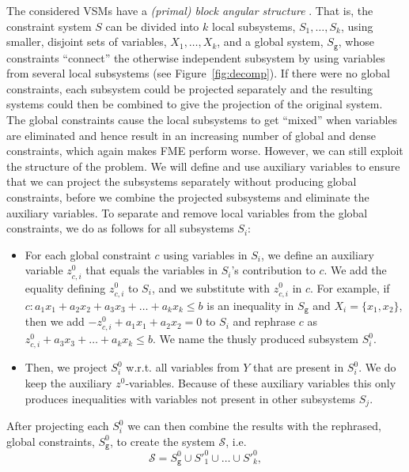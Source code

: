 \documentclass[citeauthoryear]{llncs}
\newcommand{\trt}[1]{\texttt{#1}}
\begin{document}
The considered VSMs have a \emph{(primal) block angular structure} \cite{williams}. That is, the constraint system $S$ can be divided into $k$ local subsystems, $S_1, \ldots, S_k$, using smaller, disjoint sets of variables, $X_1, \ldots, X_k$, and a global system, $S_\trt{g}$, whose constraints ``connect'' the otherwise independent subsystem by using variables from several local subsystems (see Figure~\ref{fig:decomp}). 
If there were no global constraints, each subsystem could be projected separately and the resulting systems could then be combined to give the projection of the original system. The global constraints cause the local subsystems to get ``mixed'' when variables are eliminated and hence result in an increasing number of global and dense constraints, which again makes FME perform worse. However, we can still exploit the structure of the problem. We will define and use auxiliary variables to ensure that we can project the subsystems separately without producing global constraints, before we combine the projected subsystems and eliminate the auxiliary variables. To separate and remove local variables from the global constraints, we do as follows for all subsystems $S_i$:
\begin{itemize}\itemsep0em
\item For each global constraint $c$ using variables in $S_i$, we define an auxiliary variable $z^0_{c,i}$ that equals the variables in $S_i$'s contribution to $c$. We add the equality defining $z^0_{c,i}$ to $S_i$, and we substitute with $z^0_{c,i}$ in $c$. For example, if $c: a_1x_1 + a_2x_2 + a_3x_3 + \ldots + a_kx_k \leq b$ is an inequality in $S_\trt{g}$ and $X_i = \{x_1,x_2\}$, then we add $-z^0_{c,i} + a_1x_1 + a_2x_2 = 0$ to $S_i$ and rephrase $c$ as $z^0_{c,i} + a_3x_3 + \ldots + a_kx_k \leq b$. We name the thusly produced subsystem $S_i^0$. 

\item Then, we project $S_i^0$ w.r.t. all variables from $Y$ that are present in $S_i^0$. We do keep the auxiliary $z^0$-variables. 
Because of these auxiliary variables this only produces inequalities with variables not present in other subsystems $S_j$. 
\end{itemize}
After projecting each $S_i^0$ we can then combine the results with the rephrased, global constraints, $S_\trt{g}^0$, to create the system $\mathcal{S}$, i.e. 
\begin{equation}\label{eq:curlyS}
\mathcal{S} = S^0_\trt{g} \cup S'^0_1\cup \ldots \cup S'^0_k,
\end{equation}
\end{document}
